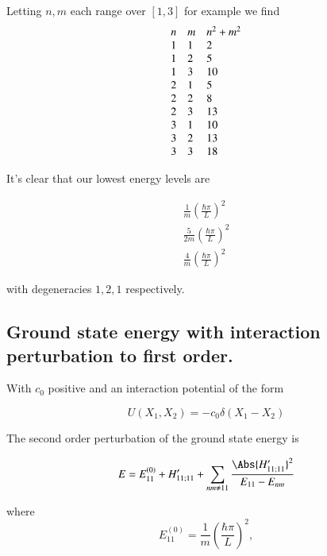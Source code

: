 Letting $n, m$ each range over $[1,3]$ for example we find
\begin{equation}\label{eqn:qmTwoPs4:330}
\begin{array}{l l l}
n & m & n^2 + m^2 \\
1 & 1 & 2 \\
1 & 2 & 5 \\
1 & 3 & 10 \\
2 & 1 & 5 \\
2 & 2 & 8 \\
2 & 3 & 13 \\
3 & 1 & 10 \\
3 & 2 & 13 \\
3 & 3 & 18
\end{array}
\end{equation}

It's clear that our lowest energy levels are 

\begin{align*}
\frac{1}{m} \left(\frac{\hbar \pi}{L}\right)^2  \\
\frac{5}{2m} \left(\frac{\hbar \pi}{L}\right)^2  \\
\frac{4}{m} \left(\frac{\hbar \pi}{L}\right)^2 
\end{align*}

with degeneracies $1, 2, 1$ respectively.

\subsection{Ground state energy with interaction perturbation to first order.}

With $c_0$ positive and an interaction potential of the form

\begin{equation}\label{eqn:qmTwoPs4:350}
U(X_1, X_2) = - c_0 \delta(X_1 - X_2)
\end{equation}

The second order perturbation of the ground state energy is

\begin{equation}\label{eqn:qmTwoPs4:370}
E = E_{11}^{(0)} + 
H_{11;11}' + 
\sum_{nm \ne 11} \frac{\Abs{H_{11;11}' }^2}{E_{11} - E_{nm}}
\end{equation}

where
\begin{equation}\label{eqn:qmTwoPs4:390}
E_{11}^{(0)} = \frac{1}{m} \left(\frac{\hbar \pi}{L}\right)^2,
\end{equation}

